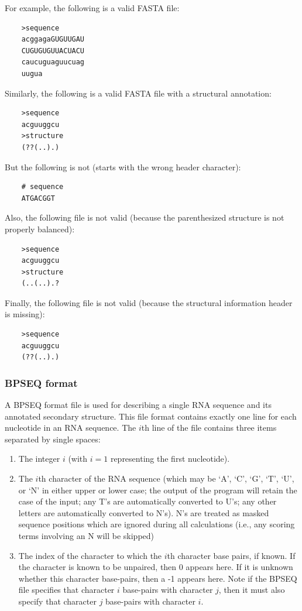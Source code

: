 \documentclass{article}
\begin{document}
  For example, the following is a valid FASTA file:
  \begin{verbatim}
    >sequence
    acggagaGUGUUGAU
    CUGUGUGUUACUACU
    caucuguaguucuag
    uugua\end{verbatim}

  Similarly, the following is a valid FASTA file with a structural annotation:
  \begin{verbatim}
    >sequence
    acguuggcu
    >structure
    (??(..).)\end{verbatim}

  But the following is not (starts with the wrong header character):
  \begin{verbatim}
    # sequence
    ATGACGGT\end{verbatim}

  Also, the following file is not valid (because the parenthesized structure is not
  properly balanced):
  \begin{verbatim}
    >sequence
    acguuggcu
    >structure
    (..(..).?\end{verbatim}

  Finally, the following file is not valid (because the structural information header is
  missing):
  \begin{verbatim}
    >sequence
    acguuggcu
    (??(..).)\end{verbatim}
  
  \subsubsection{BPSEQ format}
  \label{sec:bpseq}

  A BPSEQ format file is used for describing a single RNA sequence and its annotated
  secondary structure.  This file format contains exactly one line for each nucleotide in
  an RNA sequence.  The $i$th line of the file contains three items
  separated by single spaces:
  \begin{enumerate}
  \item The integer $i$ (with $i=1$ representing the first nucleotide).
  \item The $i$th character of the RNA sequence (which may be `A',
    `C', `G', `T', `U', or `N' in either upper or lower case; the
    output of the program will retain the case of the input; any T's
    are automatically converted to U's; any other letters are
    automatically converted to N's).  N's are treated as masked
    sequence positions which are ignored during all calculations
    (i.e., any scoring terms involving an N will be skipped)
  \item The index of the character to which the $i$th character base
    pairs, if known.  If the character is known to be unpaired, then 0
    appears here.  If it is unknown whether this character base-pairs,
    then a -1 appears here.  Note if the BPSEQ file specifies that
    character $i$ base-pairs with character $j$, then it must also
    specify that character $j$ base-pairs with character $i$.
  \end{enumerate}
\end{document}
